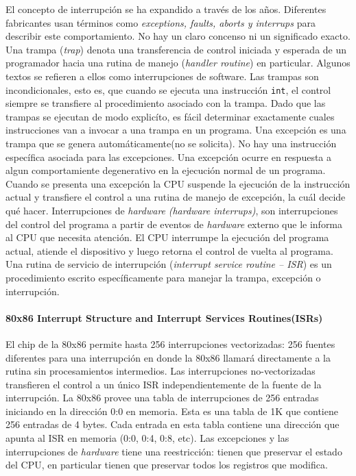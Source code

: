 El concepto de interrupción se ha expandido a través de los años. Diferentes fabricantes usan términos como \textit{exceptions, faults, aborts \textnormal{y} interrups} para describir este comportamiento. No hay un claro concenso ni un significado exacto.
Una trampa (\textit{trap}) denota una transferencia de control iniciada y esperada de un programador hacia una rutina de manejo (\textit{handler routine}) en particular. Algunos textos se refieren a ellos como interrupciones de software. Las trampas son incondicionales, esto es, que cuando se ejecuta una instrucción \texttt{int}, el control siempre se transfiere al procedimiento asociado con la trampa. Dado que las trampas se ejecutan de modo explicíto, es fácil determinar exactamente cuales instrucciones van a invocar a una trampa en un programa. Una excepción es una trampa que se genera automáticamente(no se solicita). No hay una instrucción específica asociada para las excepciones. Una excepción ocurre en respuesta a algun comportamiente degenerativo en la ejecución normal de un programa. Cuando se presenta una excepción la CPU suspende la ejecución de la instrucción actual y transfiere el control a una rutina de manejo de excepción, la cuál decide qué hacer. Interrupciones de \textit{hardware} \textit{(hardware interrups)}, son interrupciones del control del programa a partir de eventos de \textit{hardware} externo que le informa al CPU que necesita atención. El CPU interrumpe la ejecución del programa actual, atiende el dispositivo y luego retorna el control de vuelta al programa. Una rutina de servicio de interrupción (\textit{interrupt service routine -- ISR}) es un procedimiento escrito específicamente para manejar la trampa, excepción o interrupción.

\paragraph{\textnormal{\textbf{80x86 Interrupt Structure and Interrupt Services Routines(ISRs)}}}
El chip de la 80x86 permite hasta 256 interrupciones vectorizadas: 256 fuentes diferentes para una interrupción en donde la 80x86 llamará directamente a la rutina sin procesamientos intermedios. Las interrupciones no-vectorizadas transfieren el control a un único ISR independientemente de la fuente de la interrupción. La 80x86 provee una tabla de interrupciones de 256 entradas iniciando en la dirección 0:0 en memoria. Esta es una tabla de 1K que contiene 256 entradas de 4 bytes. Cada entrada en esta tabla contiene una dirección que apunta al ISR en memoria (0:0, 0:4, 0:8, etc). Las excepciones y las interrupciones de \textit{hardware} tiene una reestricción: tienen que preservar el estado del CPU, en particular tienen que preservar todos los registros que modifica.

